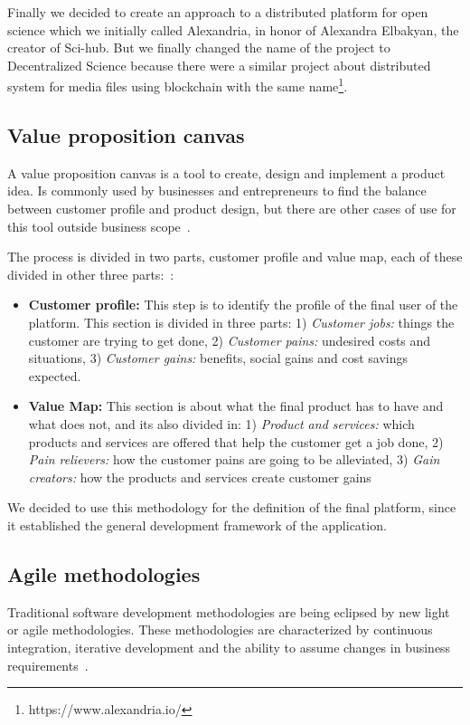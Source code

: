 Finally we decided to create an approach to a distributed platform for open
science which we initially called Alexandria, in honor of Alexandra Elbakyan,
the creator of Sci-hub. But we finally changed the name of the project to
Decentralized Science because there were a similar project about distributed
system for media files using blockchain with the same
name\footnote{https://www.alexandria.io/}.

\subsection{Value proposition canvas}


A value proposition canvas is a tool to create, design and implement a product
idea. Is commonly used by businesses and entrepreneurs to find the balance
between customer profile and product design, but there are other cases of use
for this tool outside business
scope~\cite{pokorna2015value,meertens2012mapping}.

The process is divided in two parts, customer profile and value map, each of
these divided in other three parts:~\cite{osterwalder2014value}:

\begin{itemize}
\item \textbf{Customer profile:} This step is to identify the profile of the
  final user of the platform. This section is divided in three parts: 1)
  \emph{Customer jobs:} things the customer are trying to get done, 2)
  \emph{Customer pains:} undesired costs and situations, 3) \emph{Customer
    gains:} benefits, social gains and cost savings expected.
\item \textbf{Value Map:} This section is about what the final product has to
  have and what does not, and its also divided in: 1) \emph{Product and
    services:} which products and services are offered that help the customer
  get a job done, 2) \emph{Pain relievers:} how the customer pains are going to
  be alleviated, 3) \emph{Gain creators:} how the products and services create
  customer gains
\end{itemize}

We decided to use this methodology for the definition of the final platform,
since it established the general development framework of the application.

\subsection{Agile methodologies}
Traditional software development methodologies are being eclipsed by new light
or agile methodologies. These methodologies are characterized by continuous
integration, iterative development and the ability to assume changes in business
requirements~\cite{boehm2005management,livermore2008factors}.

